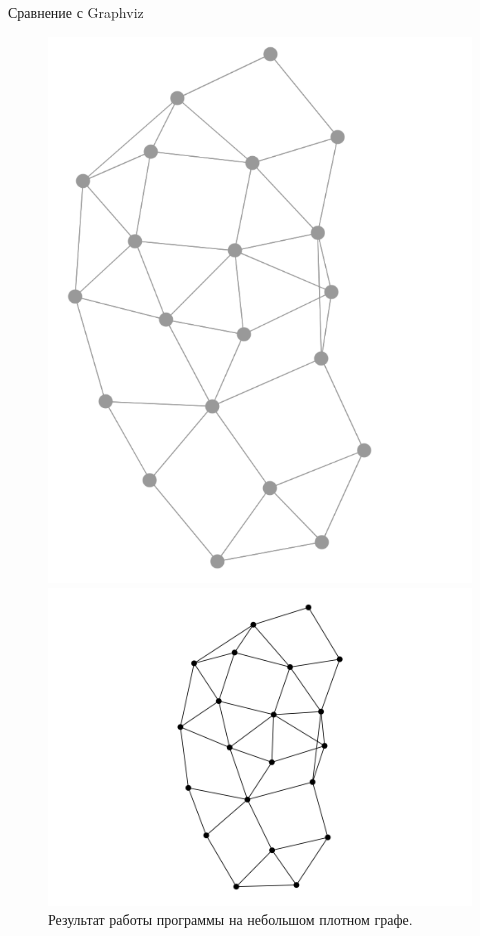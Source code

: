 \documentclass{beamer}
\begin{document}
\begin{frame}{Сравнение с Graphviz}
\begin{figure}[H]
\begin{minipage}[t]{.32\textwidth}
			\includegraphics[width=0.9\linewidth]{./imgs/kk_small_dense.png}
			\caption*{алгоритм Камады-Кавай}
		\end{minipage}
		\begin{minipage}[t]{.32\textwidth}
			\centering
			\includegraphics[width=1.4\linewidth]{./imgs/small_dense_gv.png}
			\caption*{Graphviz}
		\end{minipage}
		\caption{Результат работы программы на небольшом плотном графе.}
	\end{figure}
\end{frame}
\end{document}
